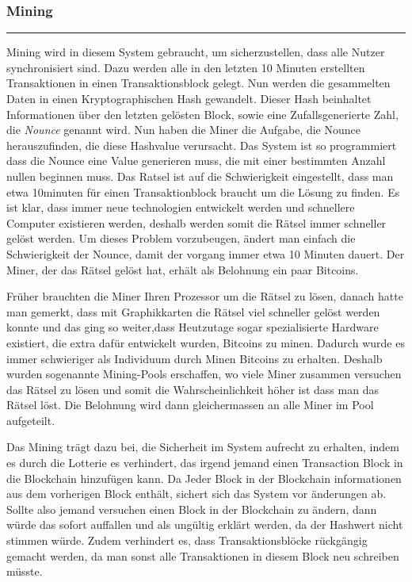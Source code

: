 \vspace*{1mm}
\subsubsection*{Mining}
\vspace{-10mm}
\noindent\rule{0.8\textwidth}{0.4pt}

\vspace{5mm}

\noindent
Mining wird in diesem System gebraucht, um sicherzustellen, dass alle Nutzer synchronisiert sind. Dazu werden alle in den letzten 10 Minuten erstellten Transaktionen in einen Transaktionsblock gelegt.
Nun werden die gesammelten Daten in einen Kryptographischen Hash gewandelt. Dieser Hash beinhaltet Informationen über den letzten gelösten Block, sowie eine Zufallsgenerierte Zahl, die
\emph{\dq Nounce \dq} genannt wird. Nun haben die Miner die Aufgabe, die Nounce herauszufinden, die diese Hashvalue verursacht. Das System ist so programmiert dass die Nounce eine Value
generieren muss, die mit einer bestimmten Anzahl nullen beginnen muss. Das Ratsel ist auf die Schwierigkeit eingestellt, dass man etwa 10minuten für einen Transaktionblock braucht um die Lösung
zu finden. Es ist klar, dass immer neue technologien entwickelt werden und schnellere Computer existieren werden, deshalb werden somit die Rätsel immer schneller gelöst werden. Um dieses Problem vorzubeugen,
ändert man einfach die Schwierigkeit der Nounce, damit der vorgang immer etwa 10 Minuten dauert. Der Miner, der das Rätsel gelöst hat, erhält als Belohnung ein paar Bitcoins.

\noindent
Früher brauchten die Miner Ihren Prozessor um die Rätsel zu lösen, danach hatte man gemerkt, dass mit Graphikkarten die Rätsel viel schneller gelöst werden konnte und das ging so weiter,dass
Heutzutage sogar spezialisierte Hardware existiert, die extra dafür entwickelt wurden, Bitcoins zu minen. Dadurch wurde es immer schwieriger als Individuum durch Minen Bitcoins zu erhalten.
Deshalb wurden sogenannte Mining-Pools erschaffen, wo viele Miner zusammen versuchen das Rätsel zu lösen und somit die Wahrscheinlichkeit höher ist dass man das Rätsel löst. Die Belohnung wird dann
gleichermassen an alle Miner im Pool aufgeteilt.

\noindent
Das Mining trägt dazu bei, die Sicherheit im System aufrecht zu erhalten, indem es durch die Lotterie es verhindert, das irgend jemand einen Transaction Block in die Blockchain hinzufügen kann.
Da Jeder Block in der Blockchain informationen aus dem vorherigen Block enthält, sichert sich das System vor änderungen ab. Sollte also jemand versuchen einen Block in der Blockchain
zu ändern, dann würde das sofort auffallen und als ungültig erklärt werden, da der Hashwert nicht stimmen würde. Zudem verhindert es, dass Transaktionsblöcke rückgängig gemacht werden, da man
sonst alle Transaktionen in diesem Block neu schreiben müsste.

